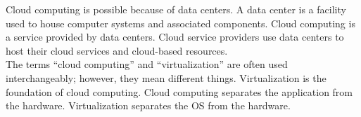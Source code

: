 Cloud computing is possible because of data centers. A data center is a facility used to house computer systems and associated components. Cloud computing is a service provided by data centers. Cloud service providers use data centers to host their cloud services and cloud-based resources.\\

The terms ``cloud computing'' and ``virtualization'' are often used interchangeably; however, they mean different things. Virtualization is the foundation of cloud computing. Cloud computing separates the application from the hardware. Virtualization separates the OS from the hardware. 